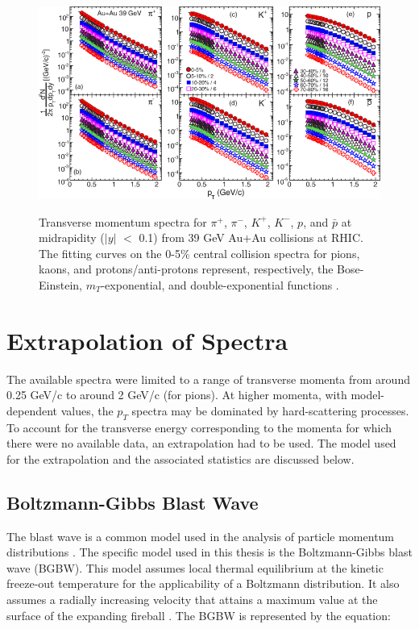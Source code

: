 \begin{figure}[h]
  \centering
  \includegraphics[width=6.5in]{../figures/PhysRevC-96-044904_pTSpectra_39.png}\\
  \caption{Transverse momentum spectra for $\pi^{+}$, $\pi^{-}$, $K^+$, $K^{-}$, $p$, and $\bar{p}$ at midrapidity ($|y|$ $<$ 0.1) from 39 GeV Au+Au collisions at RHIC. The fitting curves on the 0-5\% central collision spectra for pions, kaons, and protons/anti-protons represent, respectively, the Bose-Einstein, $m_{T}$-exponential, and double-exponential functions \cite{PhysRevC.96.044904}.}\label{fig:BESPaper_pTSpectra}
\end{figure}



\section{Extrapolation of Spectra}
The available spectra were limited to a range of transverse momenta from around 0.25 GeV/c to around 2 GeV/c (for pions). At higher momenta, with model-dependent values, the $p_{T}$ spectra may be dominated by hard-scattering processes. To account for the transverse energy corresponding to the momenta for which there were no available data, an extrapolation had to be used. The model used for the extrapolation and the associated statistics are discussed below.

\subsection{Boltzmann-Gibbs Blast Wave}
% 
The blast wave is a common model used in the analysis of particle momentum distributions \cite{Tang:2008ud,Tripathy:2017kwb,PhysRevC.96.044904}. The specific model used in this thesis is the Boltzmann-Gibbs blast wave (BGBW). This model assumes local thermal equilibrium at the kinetic freeze-out temperature for the applicability of a Boltzmann distribution. It also assumes a radially increasing velocity that attains a maximum value at the surface of the expanding fireball \cite{Tripathy:2017kwb}. The BGBW is represented by the equation: %

